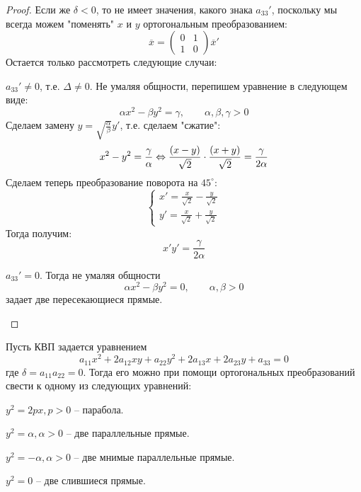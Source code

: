 \begin{proof}
	Если же $\delta < 0$, то не имеет значения, какого знака $a_{33}'$, поскольку мы всегда можем "поменять" $x$ и $y$ ортогональным преобразованием:
	\[\overline{x} = \left(\begin{array}{cc}
	0 & 1 \\ 
	1 & 0
	\end{array}\right) \overline{x}'\]
	Остается только рассмотреть следующие случаи:
	\begin{MyList}
		\item $a_{33}' \neq 0$, т.е. $\Delta \neq 0$.
		Не умаляя общности, перепишем уравнение в следующем виде:
		\[\alpha x^2 - \beta y^2 = \gamma, \qquad \alpha, \beta, \gamma > 0\]	
		Сделаем замену $y = \sqrt{\frac{\alpha}{\beta}} y'$, т.е. сделаем "сжатие":
		\[x^2 - y^2 = \frac{\gamma}{\alpha} \Leftrightarrow \frac{(x - y)}{\sqrt{2}} \cdot \frac{(x + y)}{\sqrt{2}} = \frac{\gamma}{2\alpha}\]
		Сделаем теперь преобразование поворота на $45^\circ$:
		\[\begin{cases}
			x' = \frac{x}{\sqrt{2}} - \frac{y}{\sqrt{2}} \\
			y' = \frac{x}{\sqrt{2}} + \frac{y}{\sqrt{2}} 
		\end{cases}\]  
		Тогда получим:
		\[x'y' = \frac{\gamma}{2\alpha}\]

		\begin{figure}[H]
			\centering
			\def\svgwidth{.7\columnwidth}
			
		\end{figure}

		\item $a_{33}' = 0$. Тогда не умаляя общности
		\[\alpha x^2 - \beta y^2 = 0, \qquad \alpha, \beta > 0\]
		задает две пересекающиеся прямые.
	\end{MyList} 
\end{proof}


\begin{Thm}
	Пусть КВП задается уравнением
	\[a_{11} x^2 + 2a_{12} xy + a_{22} y^2 + 2a_{13}x + 2a_{23}y + a_{33} = 0\]
	где $\delta = a_{11} a_{22} = 0$. Тогда его можно при помощи ортогональных преобразований свести к одному из следующих уравнений:
	\begin{MyList}
		\item $y^2 = 2px, p > 0$ -- парабола.
		\item $y^2 = \alpha, \alpha > 0$ -- две параллельные прямые.
		\item $y^2 = -\alpha, \alpha > 0$ -- две мнимые параллельные прямые.
		\item $y^2 = 0$ -- две слившиеся прямые.
	\end{MyList}
\end{Thm}

